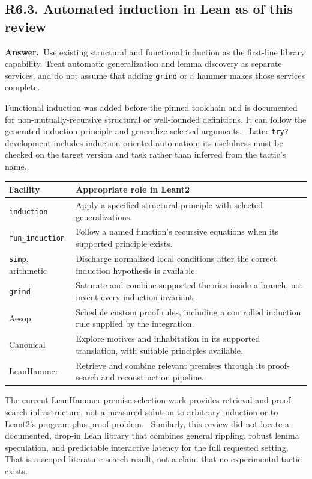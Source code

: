 \documentclass[11pt,a4paper]{article}
\newcommand{\code}[1]{\nolinkurl{#1}}
\newcommand{\qid}[3]{\subsection{#2. #3}\label{#1}}
\newcommand{\answer}{\noindent\textbf{Answer.}\ }
\theoremstyle{remark}
\begin{document}
\qid{q63}{R6.3}{Automated induction in Lean as of this review}
\answer Use existing structural and functional induction as the first-line library capability. Treat automatic generalization and lemma discovery as separate services, and do not assume that adding \code{grind} or a hammer makes those services complete.

Functional induction was added before the pinned toolchain and is documented for non-mutually-recursive structural or well-founded definitions. It can follow the generated induction principle and generalize selected arguments.~\cite{lean418} Later \code{try?} development includes induction-oriented automation; its usefulness must be checked on the target version and task rather than inferred from the tactic's name.~\cite{lean426}

\begin{center}
\begin{tabularx}{\textwidth}{@{}P{28mm}Y@{}}
\toprule
Facility & Appropriate role in Leant2\\
\midrule
\code{induction} & Apply a specified structural principle with selected generalizations.\\
\code{fun_induction} & Follow a named function's recursive equations when its supported principle exists.\\
\code{simp}, arithmetic & Discharge normalized local conditions after the correct induction hypothesis is available.\\
\code{grind} & Saturate and combine supported theories inside a branch, not invent every induction invariant.\\
Aesop & Schedule custom proof rules, including a controlled induction rule supplied by the integration.\\
Canonical & Explore motives and inhabitation in its supported translation, with suitable principles available.\\
LeanHammer & Retrieve and combine relevant premises through its proof-search and reconstruction pipeline.\\
\bottomrule
\end{tabularx}
\end{center}

The current LeanHammer premise-selection work provides retrieval and proof-search infrastructure, not a measured solution to arbitrary induction or to Leant2's program-plus-proof problem.~\cite{leanhammer} Similarly, this review did not locate a documented, drop-in Lean library that combines general rippling, robust lemma speculation, and predictable interactive latency for the full requested setting. That is a scoped literature-search result, not a claim that no experimental tactic exists.
\end{document}
